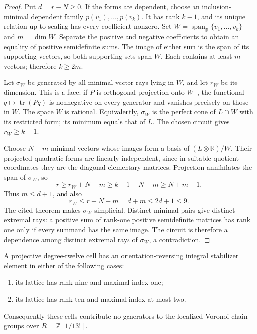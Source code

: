 \begin{proof}
Put $d=r-N\geq0$. If the forms are dependent, choose an
inclusion-minimal dependent family $p(v_1),\ldots,p(v_k)$.
It has rank $k-1$, and its unique relation up to scaling has every
coefficient nonzero. Set $W=\operatorname{span}_{\mathbb R}
\{v_1,\ldots,v_k\}$ and $m=\dim W$. Separate the positive and negative
coefficients to obtain an equality of positive semidefinite sums.
The image of either sum is the span of its supporting vectors, so
both supporting sets span $W$. Each contains at least $m$ vectors;
therefore $k\geq2m$.

Let $\sigma_W$ be generated by all minimal-vector rays lying in $W$,
and let $r_W$ be its dimension. This is a face: if $P$ is orthogonal
projection onto $W^\perp$, the functional $q\mapsto\operatorname{tr}(Pq)$
is nonnegative on every generator and vanishes precisely on those
in $W$. The space $W$ is rational. Equivalently, $\sigma_W$ is the
perfect cone of $L\cap W$ with its restricted form; its minimum
equals that of $L$. The chosen circuit gives $r_W\geq k-1$.

Choose $N-m$ minimal vectors whose images form a basis of
$(L\otimes\mathbb R)/W$. Their projected quadratic forms are linearly
independent, since in suitable quotient coordinates they are the
diagonal elementary matrices. Projection annihilates the span of
$\sigma_W$, so
\[
 r\geq r_W+N-m\geq k-1+N-m\geq N+m-1.
\]
Thus $m\leq d+1$, and also
\[
 r_W\leq r-N+m=d+m\leq2d+1\leq9.
\]
The cited theorem makes $\sigma_W$ simplicial. Distinct minimal pairs
give distinct extremal rays: a positive sum of rank-one positive
semidefinite matrices has rank one only if every summand has the
same image. The circuit is therefore a dependence among distinct
extremal rays of $\sigma_W$, a contradiction.
\end{proof}

\begin{proposition}
\label{prop:k12-low-index-orientation}
A projective degree-twelve cell has an orientation-reversing integral
stabilizer element in either of the following cases:
\begin{enumerate}
\item its lattice has rank nine and maximal index one;
\item its lattice has rank ten and maximal index at most two.
\end{enumerate}
Consequently these cells contribute no generators to the localized
Voronoi chain groups over $R=\mathbb Z[1/13!]$.
\end{proposition}


